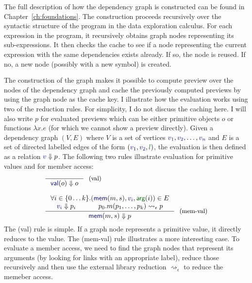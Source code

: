 \documentclass[fleqn,11pt]{report}
\newcommand{\bndclr}[1]{\textcolor{kvdclr}{#1}}
\newcommand{\blblclr}[1]{\textcolor{numclr}{#1}}
\newcommand{\bnd}[1]{\textnormal{\textcolor{kvdclr}{\sffamily #1}}}
\newcommand{\blbl}[1]{\textnormal{\textcolor{numclr}{\sffamily #1}}}
\theoremstyle{definition}
\begin{document}
The full description of how the dependency graph is constructed can be found in
Chapter~\ref{ch:foundations}. The construction proceeds recursively over the syntactic structure
of the program in the data exploration calculus. For each expression in the program, it recursively
obtains graph nodes representing its sub-expressions. It then checks the cache to see if a node
representing the current expression with the same dependencies exists already. If so, the node is
reused. If no, a new node (possibly with a new symbol) is created.

The construction of the graph makes it possible to compute preview over the nodes of the
dependency graph and cache the previously computed previews by using the graph node as the cache
key. I illustrate how the evaluation works using two of the reduction rules. For simplicity,
I do not discuss the caching here. I will also write $p$ for evaluated previews which can be either
primitive objects $o$ or functions $\lambda x.e$ (for which we cannot show a preview directly).
Given a dependency graph $(V, E)$ where $V$ is a set of vertices $\bndclr{v_1}, \bndclr{v_2}, \ldots, \bndclr{v_n}$
and $E$ is a set of directed labelled edges of the form $(\bndclr{v_1}, \bndclr{v_2}, \blblclr{l})$,
the evaluation is then defined as a relation $\bndclr{v} \Downarrow p$. The following two rules
illustrate evaluation for primitive values and for member access:
%
\begin{equation*}
\begin{array}{l}
\inference
  {~}
  {\bnd{val}(o) \Downarrow o }~~\text{\small (val)}
\\~\\
\inference
  { \forall i\in\{0\ldots k\}.(\bnd{mem}(m, s), \bndclr{v_i}, \blbl{arg}(i)) \in E \\
    \bndclr{v_i} \Downarrow p_i & p_0.m(p_1, \ldots, p_k) \rightsquigarrow_\epsilon p }
  { \bnd{mem}(m, s) \Downarrow p }~~\text{\small (mem-val)}
\end{array}
\end{equation*}
%
The (val) rule is simple. If a graph node represents a primitive value, it directly reduces to
the value. The (mem-val) rule illustrates a more interesting case. To evaluate a member access,
we need to find the graph nodes that represent its arguments (by looking for links with an
appropriate label), reduce those recursively and then use the external library reduction
$\rightsquigarrow_\epsilon$ to reduce the memeber access.
\end{document}
